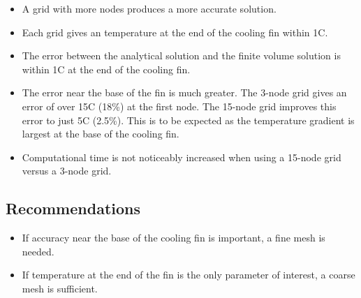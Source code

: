 \documentclass[review]{elsarticle}
\begin{document}
\begin{itemize}
  \item A grid with more nodes produces a more accurate solution.
  \item Each grid gives an temperature at the end of the cooling fin within 1\degree C.
  \item The error between the analytical solution and the finite volume solution is within 1\degree C at the end of the cooling fin.
  \item The error near the base of the fin is much greater. The 3-node grid gives an error of over 15\degree C (18\%) at the first node. The 15-node grid improves this error to just 5\degree C (2.5\%). This is to be expected as the temperature gradient is largest at the base of the cooling fin.
  \item Computational time is not noticeably increased when using a 15-node grid versus a 3-node grid.
\end{itemize}

\subsection{Recommendations}
\begin{itemize}
  \item If accuracy near the base of the cooling fin is important, a fine mesh is needed.
  \item If temperature at the end of the fin is the only parameter of interest, a coarse mesh is sufficient.
\end{itemize}




% 
\end{document}
